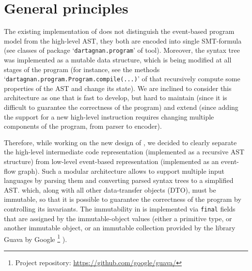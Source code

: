 \section{General principles}
\label{ch:impl:principles}

The existing implementation of \porthos{} does not distinguish the event-based program model from the high-level AST, they both are encoded into single SMT-formula (see classes of package `\texttt{dartagnan.program}' of \porthos tool).
Moreover, the syntax tree was implemented as a mutable data structure, which is being modified at all stages of the program (for instance, see the methods `\texttt{dartagnan.program.Program.compile(...)}' of \porthos{} that recursively compute some properties of the AST and change its state).
We are inclined to consider this architecture as one that is fast to develop, but hard to maintain (since it is difficult to guarantee the correctness of the program) and extend (since adding the support for a new high-level instruction requires changing multiple components of the program, from parser to encoder).


Therefore, while working on the new design of \porthos[2], we decided to clearly separate the high-level intermediate code representation (implemented as a recursive AST structure) from low-level event-based representation (implemented as an event-flow graph).
Such a modular architecture allows to support multiple input languages by parsing them and converting parsed syntax trees to a simplified AST. which, along with all other data-transfer objects (DTO), must be immutable, so that it is possible to guarantee the correctness of the program by controlling its invariants.
The immutability in \porthos[2] is implemented via \texttt{final} fields that are assigned by the immutable-object values (either a primitive type, or another immutable object, or an immutable collection provided by the library Guava by Google%
\footnote{Project repository: \url{https://github.com/google/guava/}}%
).

